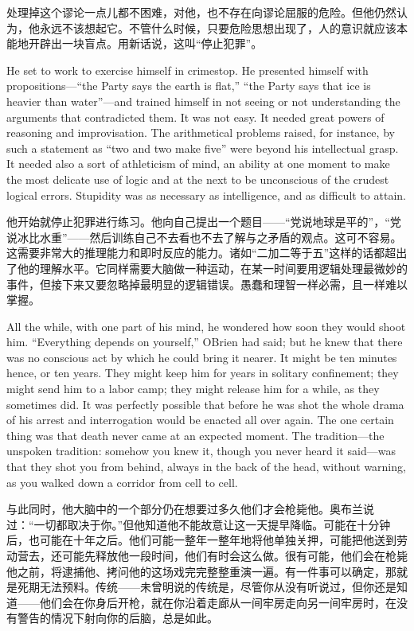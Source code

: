 \begin{paracol}{2}
\switchcolumn

处理掉这个谬论一点儿都不困难，对他，也不存在向谬论屈服的危险。但他仍然认为，他永远不该想起它。不管什么时候，只要危险思想出现了，人的意识就应该本能地开辟出一块盲点。用新话说，这叫``停止犯罪''。

\switchcolumn*

He set to work to exercise himself in crimestop. He presented himself
with propositions---``the Party says the earth is flat,'' ``the Party says
that ice is heavier than water''---and trained himself in not seeing or
not understanding the arguments that contradicted them. It was not easy.
It needed great powers of reasoning and improvisation. The arithmetical
problems raised, for instance, by such a statement as ``two and two make
five'' were beyond his intellectual grasp. It needed also a sort of
athleticism of mind, an ability at one moment to make the most delicate
use of logic and at the next to be unconscious of the crudest logical
errors. Stupidity was as necessary as intelligence, and as difficult to
attain.

\switchcolumn

他开始就停止犯罪进行练习。他向自己提出一个题目——``党说地球是平的''，``党说冰比水重''——然后训练自己不去看也不去了解与之矛盾的观点。这可不容易。这需要非常大的推理能力和即时反应的能力。诸如``二加二等于五''这样的话都超出了他的理解水平。它同样需要大脑做一种运动，在某一时间要用逻辑处理最微妙的事件，但接下来又要忽略掉最明显的逻辑错误。愚蠢和理智一样必需，且一样难以掌握。

\switchcolumn*

All the while, with one part of his mind, he wondered how soon they
would shoot him. ``Everything depends on yourself,''
O\textquotesingle Brien had said; but he knew that there was no
conscious act by which he could bring it nearer. It might be ten minutes
hence, or ten years. They might keep him for years in solitary
confinement; they might send him to a labor camp; they might release him
for a while, as they sometimes did. It was perfectly possible that
before he was shot the whole drama of his arrest and interrogation would
be enacted all over again. The one certain thing was that death never
came at an expected moment. The tradition---the unspoken tradition:
somehow you knew it, though you never heard it said---was that they shot
you from behind, always in the back of the head, without warning, as you
walked down a corridor from cell to cell.

\switchcolumn

与此同时，他大脑中的一个部分仍在想要过多久他们才会枪毙他。奥布兰说过：``一切都取决于你。''但他知道他不能故意让这一天提早降临。可能在十分钟后，也可能在十年之后。他们可能一整年一整年地将他单独关押，可能把他送到劳动营去，还可能先释放他一段时间，他们有时会这么做。很有可能，他们会在枪毙他之前，将逮捕他、拷问他的这场戏完完整整重演一遍。有一件事可以确定，那就是死期无法预料。传统——未曾明说的传统是，尽管你从没有听说过，但你还是知道——他们会在你身后开枪，就在你沿着走廊从一间牢房走向另一间牢房时，在没有警告的情况下射向你的后脑，总是如此。


\end{paracol}

